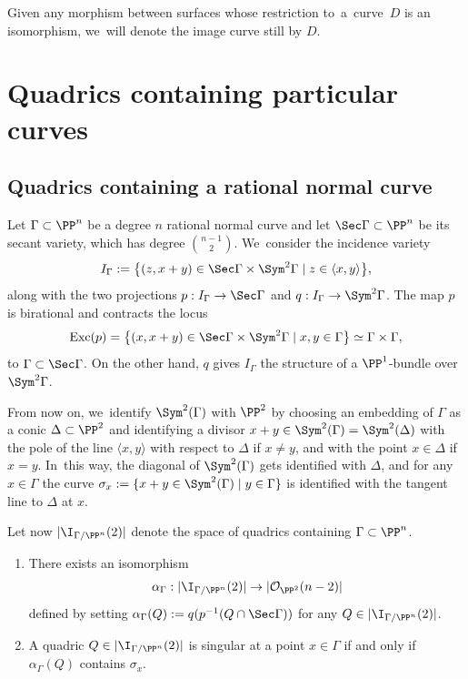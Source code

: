 \begin{notation}\label{pinguini}
Given any morphism between surfaces whose restriction to~a~curve~$D$ is an isomorphism, we~will denote the image curve still by $D$.
\end{notation}

\section{Quadrics containing particular curves}\label{figo}

\subsection{Quadrics containing a rational normal curve}\label{federico}

Let $\Gamma\subset \PP^n$ be a degree $n$ rational normal curve and let $\Sec\Gamma\subset \PP^n$ be its secant variety, which has degree $\binom{n-1}{2}$. We~consider the incidence variety
\[
I_\Gamma:=\bigl\{(z,x+y)\in \Sec\Gamma\times \Sym^2\Gamma\mid z\in \langle x,y\rangle \bigr\},
\]
along with the two projections $p:I_\Gamma\to \Sec\Gamma$ and $q: I_\Gamma\to \Sym^2\Gamma$. The map $p$ is birational and contracts the locus
\[
\mathrm{Exc} (p)=\left\{(x,x+y)\in \Sec\Gamma\times \Sym^2\Gamma\mid x,y\in \Gamma \right\}\simeq \Gamma\times \Gamma,
\]
to $\Gamma\subset \Sec\Gamma$. On the other hand, $q$ gives $I_\Gamma$ the structure of a $\PP^1$-bundle over $\Sym^2\Gamma$.

From now on, we~identify $\Sym^2(\Gamma)$ with $\PP^2$ by choosing an embedding of $\Gamma$ as a conic $\Delta\subset \PP^2$ and identifying a divisor $x+y\in \Sym^2(\Gamma)=\Sym^2(\Delta)$ with the pole of the line $\langle x,y\rangle$ with respect to $\Delta$ if $x\neq y$, and with the point $x\in \Delta$ if $x=y$. In~this way, the diagonal of $\Sym^2(\Gamma)$ gets identified with $\Delta$, and for any $x\in \Gamma$ the curve $\sigma_x:=\{x+y\in \Sym^2(\Gamma)\mid y\in \Gamma\}$ is identified with the tangent line to $\Delta$ at $x$.

Let now $|\I_{\Gamma/\PP^n}(2)|$ denote the space of quadrics containing $\Gamma\subset \PP^n$.

\skpt

\begin{prop}\label{razionale}
\begin{enumerate}
\item\label{razionalei}
There exists an isomorphism
\[
\alpha_\Gamma: |\I_{\Gamma/\PP^n}(2)|\to |\mathcal O_{\PP^2}(n-2)|
\]
defined by setting $\alpha_\Gamma(Q):=q(p^{-1}(Q\cap\Sec \Gamma))$ for any $Q\in |\I_{\Gamma/\PP^n}(2)|$.
\item\label{razionaleii}
A quadric $Q\in |\I_{\Gamma/\PP^n}(2)|$ is singular at a point $x\in \Gamma$ if and only if $\alpha_\Gamma(Q)$ contains $\sigma _x$.
\end{enumerate}
\end{prop}

